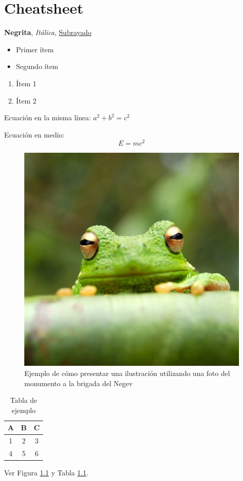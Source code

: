 \chapter{Cheatsheet}

\textbf{Negrita}, \textit{Itálica}, \underline{Subrayado}  

\begin{itemize}
    \item Primer ítem
    \item Segundo ítem
\end{itemize}

\begin{enumerate}
    \item Ítem 1
    \item Ítem 2
\end{enumerate}

Ecuación en la misma línea: $a^2 + b^2 = c^2$

Ecuación en medio: $$E = mc^2$$

\begin{figure}[htbp]
    \centering
    \includegraphics[width=0.3\linewidth, fbox]{figuras/frog.jpg}
    \caption{Ejemplo de cómo presentar una ilustración utilizando una foto del monumento a la brigada del Negev}
    \label{fig:ejemplo}
\end{figure}

\begin{table}[htbp]
    \centering
    \caption{Tabla de ejemplo}
    \begin{tabular}{|c|c|c|}
    \hline
    A & B & C \\ \hline
    1 & 2 & 3 \\ \hline
    4 & 5 & 6 \\ \hline
    \end{tabular}
    \label{tab:ejemplo}
\end{table}

Ver Figura \ref{fig:ejemplo} y Tabla \ref{tab:ejemplo}.

